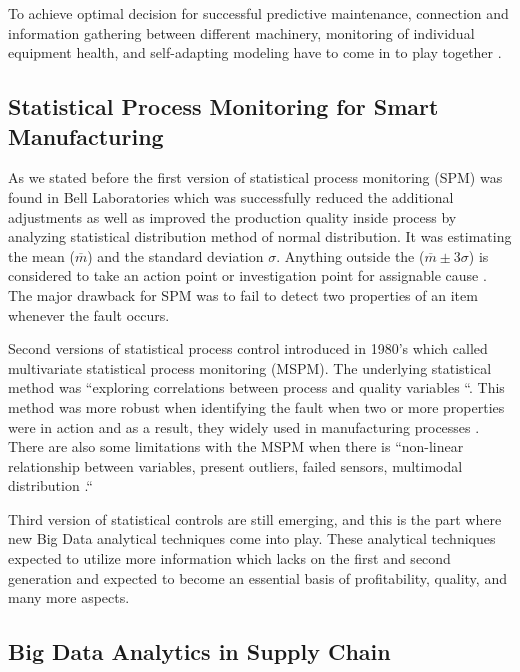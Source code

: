 \documentclass[sigconf]{acmart}
\begin{document}
\par To achieve optimal decision for successful predictive maintenance, connection and information gathering between different machinery, monitoring of individual equipment health, and self-adapting modeling have to come in to play together \cite{HE2017}. 

\subsection{Statistical Process Monitoring for Smart Manufacturing}

As we stated before the first version of statistical process monitoring (SPM) was found in Bell Laboratories which was successfully reduced the additional adjustments as well as improved the production quality inside process by analyzing statistical distribution method of normal distribution. It was estimating the mean ($\overline{m}$) and the standard deviation $\sigma $. Anything outside the ($\overline{m}\pm 3\sigma$) is considered to take an action point or investigation point for assignable cause \cite{HE2017}. The major drawback for SPM was to fail to detect two properties of an item whenever the fault occurs.


\par Second versions of statistical process control introduced in 1980's which called multivariate statistical process monitoring (MSPM). The underlying statistical method was ``exploring correlations between process and quality variables \cite{HE2017}``. This method was more robust when identifying the fault when two or more properties were in action and as a result, they widely used in manufacturing processes \cite{HE2017}. There are also some limitations with the MSPM when there is ``non-linear relationship between variables, present outliers, failed sensors, multimodal distribution \cite{HE2017}.``



\par Third version of statistical controls are still emerging, and this is the part where new Big Data analytical techniques come into play. These analytical techniques expected to utilize more information which lacks on the first and second generation and expected to become an essential basis of profitability, quality, and many more aspects.

\subsection{Big Data Analytics in Supply Chain }
\end{document}
